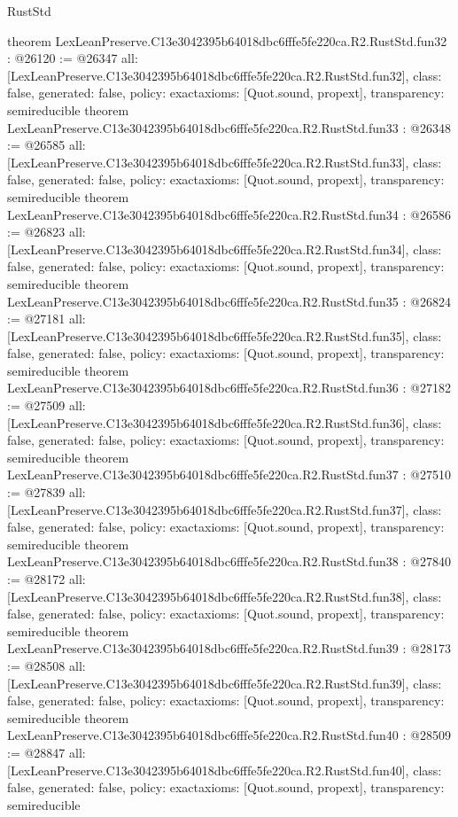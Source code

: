 \begin{lexlean}{RustStd}
\begin{coremodule}
{}
theorem LexLeanPreserve.C13e3042395b64018dbc6fffe5fe220ca.R2.RustStd.fun32 : @26120 := @26347 {
  all: [LexLeanPreserve.C13e3042395b64018dbc6fffe5fe220ca.R2.RustStd.fun32],
  class: false,
  generated: false,
  policy: exact{axioms: [Quot.sound, propext]},
  transparency: semireducible
}
theorem LexLeanPreserve.C13e3042395b64018dbc6fffe5fe220ca.R2.RustStd.fun33 : @26348 := @26585 {
  all: [LexLeanPreserve.C13e3042395b64018dbc6fffe5fe220ca.R2.RustStd.fun33],
  class: false,
  generated: false,
  policy: exact{axioms: [Quot.sound, propext]},
  transparency: semireducible
}
theorem LexLeanPreserve.C13e3042395b64018dbc6fffe5fe220ca.R2.RustStd.fun34 : @26586 := @26823 {
  all: [LexLeanPreserve.C13e3042395b64018dbc6fffe5fe220ca.R2.RustStd.fun34],
  class: false,
  generated: false,
  policy: exact{axioms: [Quot.sound, propext]},
  transparency: semireducible
}
theorem LexLeanPreserve.C13e3042395b64018dbc6fffe5fe220ca.R2.RustStd.fun35 : @26824 := @27181 {
  all: [LexLeanPreserve.C13e3042395b64018dbc6fffe5fe220ca.R2.RustStd.fun35],
  class: false,
  generated: false,
  policy: exact{axioms: [Quot.sound, propext]},
  transparency: semireducible
}
theorem LexLeanPreserve.C13e3042395b64018dbc6fffe5fe220ca.R2.RustStd.fun36 : @27182 := @27509 {
  all: [LexLeanPreserve.C13e3042395b64018dbc6fffe5fe220ca.R2.RustStd.fun36],
  class: false,
  generated: false,
  policy: exact{axioms: [Quot.sound, propext]},
  transparency: semireducible
}
theorem LexLeanPreserve.C13e3042395b64018dbc6fffe5fe220ca.R2.RustStd.fun37 : @27510 := @27839 {
  all: [LexLeanPreserve.C13e3042395b64018dbc6fffe5fe220ca.R2.RustStd.fun37],
  class: false,
  generated: false,
  policy: exact{axioms: [Quot.sound, propext]},
  transparency: semireducible
}
theorem LexLeanPreserve.C13e3042395b64018dbc6fffe5fe220ca.R2.RustStd.fun38 : @27840 := @28172 {
  all: [LexLeanPreserve.C13e3042395b64018dbc6fffe5fe220ca.R2.RustStd.fun38],
  class: false,
  generated: false,
  policy: exact{axioms: [Quot.sound, propext]},
  transparency: semireducible
}
theorem LexLeanPreserve.C13e3042395b64018dbc6fffe5fe220ca.R2.RustStd.fun39 : @28173 := @28508 {
  all: [LexLeanPreserve.C13e3042395b64018dbc6fffe5fe220ca.R2.RustStd.fun39],
  class: false,
  generated: false,
  policy: exact{axioms: [Quot.sound, propext]},
  transparency: semireducible
}
theorem LexLeanPreserve.C13e3042395b64018dbc6fffe5fe220ca.R2.RustStd.fun40 : @28509 := @28847 {
  all: [LexLeanPreserve.C13e3042395b64018dbc6fffe5fe220ca.R2.RustStd.fun40],
  class: false,
  generated: false,
  policy: exact{axioms: [Quot.sound, propext]},
  transparency: semireducible
}
\end{coremodule}
\end{lexlean}
